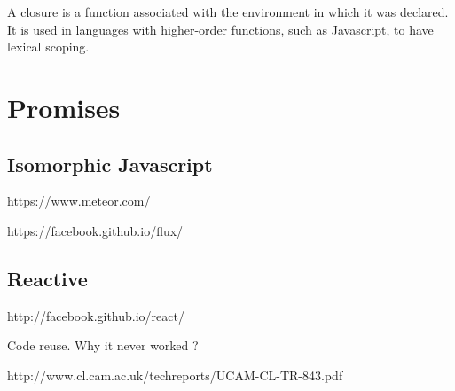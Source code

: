 A closure is a function associated with the environment in which it was declared.
It is used in languages with higher-order functions, such as Javascript, to have lexical scoping.




\section{Promises}











\subsection{Isomorphic Javascript}

https://www.meteor.com/

https://facebook.github.io/flux/


\subsection{Reactive}



http://facebook.github.io/react/




Code reuse.
Why it never worked ?




http://www.cl.cam.ac.uk/techreports/UCAM-CL-TR-843.pdf